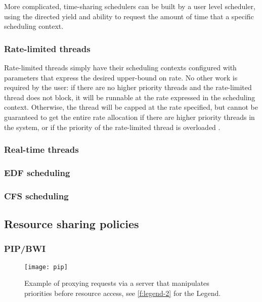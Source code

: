 More complicated, time-sharing schedulers can be built by a user level scheduler, using the directed yield and ability to request the amount of time that a specific scheduling context.

\subsubsection{Rate-limited threads}

Rate-limited threads simply have their scheduling contexts configured with
parameters that express the desired upper-bound on rate.  No other work is
required by the user: if there are no higher priority threads and the
rate-limited thread does not block, it will be runnable at the rate expressed
in the scheduling context.  Otherwise, the thread will be capped at the rate
specified, but cannot be guaranteed to get the entire rate allocation if there
are higher priority threads in the system, or if the priority of the
rate-limited thread is overloaded .

\subsubsection{Real-time threads}


\subsubsection{EDF scheduling}


\subsubsection{CFS scheduling}


\subsection{Resource sharing policies}

\subsubsection{\gls{PIP}/\gls{BWI}}
\label{sec:model-pip-bwi}

\begin{figure}
    \centering
    \texttt{[image: pip]}
    \caption{Example of proxying requests via a server that manipulates priorities before resource
    access, see \cref{f:legend-2} for the Legend.}
    \label{f:model-pip}
\end{figure}
 
